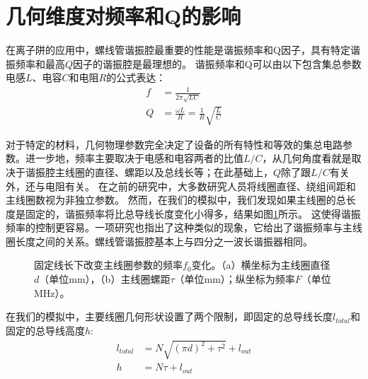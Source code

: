 \section[几何参数对频率和Q的影响]{几何维度对频率和Q的影响}

在离子阱的应用中，螺线管谐振腔最重要的性能是谐振频率和Q因子，具有特定谐振频率和最高$Q$因子的谐振腔是最理想的\cite[]{Siverns_Simkins_Weidt_Hensinger_2012}。
谐振频率和Q可以由以下包含集总参数电感$L$、电容$C$和电阻$R$的公式表达：
\begin{align}
    f&=\frac{1}{2\pi\sqrt{LC}} \label{eq:helical_f_equation}\\
	Q&=\frac{\omega L}{R}=\frac{1}{R}\sqrt{\frac{L}{C}} \label{eq:helical_Q_equation}
\end{align}

对于特定的材料，几何物理参数完全决定了设备的所有特性和等效的集总电路参数。进一步地，频率主要取决于电感和电容两者的比值$L/C$，从几何角度看就是取决于谐振腔主线圈的直径、螺距以及总线长等；在此基础上，$Q$除了跟$L/C$有关外，还与电阻有关。
在之前的研究中，大多数研究人员将线圈直径、绕组间距和主线圈数视为非独立参数\cite[]{Siverns_Simkins_Weidt_Hensinger_2012,Macalpine_Schildknecht_1959}。
然而，在我们的模拟中，我们发现如果主线圈的总长度是固定的，谐振频率将比总导线长度变化小得多，结果如图\ref{fig:helical_fixedwirelength}所示。
这使得谐振频率的控制更容易。一项研究\cite[]{Nandi_Sikdar_Das_Ray_2022}也指出了这种类似的现象，它给出了谐振频率与主线圈长度之间的关系。螺线管谐振腔基本上与四分之一波长谐振器相同。
\begin{figure}
    \centering
    \caption[固定线长下改变主线圈参数的频率$f_0$变化]{固定线长下改变主线圈参数的频率$f_0$变化。（a）横坐标为主线圈直径$d$（单位mm），（b）主线圈螺距$\tau$（单位mm）；纵坐标为频率$F$（单位MHz）。\label{fig:helical_fixedwirelength}}
\end{figure}

在我们的模拟中，主要线圈几何形状设置了两个限制，即固定的总导线长度$l_{total}$和固定的总导线高度$h$:
\begin{align}
    l_{total}&=N\sqrt{(\pi d)^2+\tau^2}+l_{out} \label{eq:helical_fixed_constraints_1}\\
	h&=N\tau+l_{out} \label{eq:helical_fixed_constraints_2}
\end{align}

